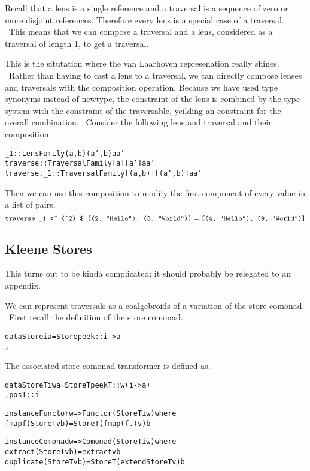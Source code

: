 \documentclass{article}
\newcommand{\tmtexttt}[1]{{\ttfamily{#1}}}
\begin{document}
Recall that a lens is a single reference and a traversal is a sequence of zero
or more disjoint references. Therefore every lens is a special case of a
traversal. \ This means that we can compose a traversal and a lens, considered
as a traversal of length 1, to get a traversal.

This is the situtation where the van Laarhoven represenation really shines. \
Rather than having to cast a lens to a traversal, we can directly compose
lenses and traversals with the composition operation. Because we have used
type synonyms instead of newtype, the \tmtexttt{Functor} constraint of the
lens is combined by the type system with the \tmtexttt{Applicative} constraint
of the traversable, yeilding an \tmtexttt{Applicative} constraint for the
overall combination. \ Consider the following lens and traversal and their
composition.
\begin{alltt}
_1 :: LensFamily (a, b) (a', b) a a'
traverse :: TraversalFamily [a] [a'] a a'
traverse._1 :: TraversalFamily [(a,b)] [(a',b)] a a'
\end{alltt}


Then we can use this composition to modify the first component of every value
in a list of pairs.
\[ \text{\tmtexttt{traverse.\_1 <\~{ } (\^{ }2) \$ [(2, ``Hello''), (3,
   ``World'')]}} = \text{\tmtexttt{[(4, ``Hello''), (9, ``World'')]}} \]

\subsection{Kleene Stores}

{\color{red} This turns out to be kinda complicated; it should probably be
relegated to an appendix.}

We can represent traversals as a coalgebroids of a variation of the store
comonad. \ First recall the definition of the store comonad.
\begin{alltt}
data Store i a = Store { peek :: i -> a
                       , 
                       }
\end{alltt}
The associated store comonad transformer is defined as.
\begin{alltt}
data StoreT i w a = StoreT { peekT :: w (i -> a)
                           , posT :: i
                           }

instance Functor w => Functor (StoreT i w) where
  fmap f (StoreT v b) = StoreT (fmap (f .) v) b

instance Comonad w => Comonad (StoreT i w) where
  extract (StoreT v b) = extract v b
  duplicate (StoreT v b) = StoreT (extend StoreT v) b
\end{alltt}
\end{document}
